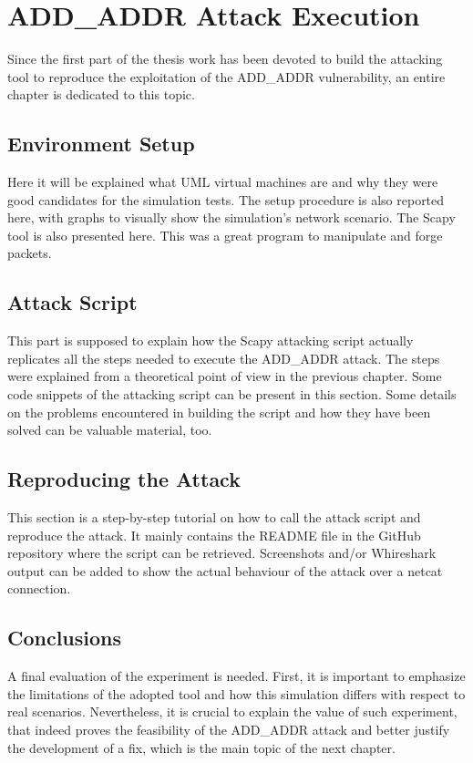 \chapter{ADD\_ADDR Attack Execution}
\label{chap:addaddrattackexecution}

Since the first part of the thesis work has been devoted to build the attacking tool to reproduce the exploitation of the ADD\_ADDR vulnerability, an entire chapter is dedicated to this topic.

\section{Environment Setup}
Here it will be explained what UML virtual machines are and why they were good candidates for the simulation tests. The setup procedure is also reported here, with graphs to visually show the simulation's network scenario. The Scapy tool is also presented here. This was a great program to manipulate and forge packets.

\section{Attack Script}
This part is supposed to explain how the Scapy attacking script actually replicates all the steps needed to execute the ADD\_ADDR attack. The steps were explained from a theoretical point of view in the previous chapter. Some code snippets of the attacking script can be present in this section.
Some details on the problems encountered in building the script and how they have been solved can be valuable material, too.

\section{Reproducing the Attack}
This section is a step-by-step tutorial on how to call the attack script and reproduce the attack. It mainly contains the README file in the GitHub repository where the script can be retrieved.
Screenshots and/or Whireshark output can be added to show the actual behaviour of the attack over a netcat connection.

\section{Conclusions} 
A final evaluation of the experiment is needed. First, it is important to emphasize the limitations of the adopted tool and how this simulation differs with respect to real scenarios. Nevertheless, it is crucial to explain the value of such experiment, that indeed proves the feasibility of the ADD\_ADDR attack and better justify the development of a fix, which is the main topic of the next chapter.

